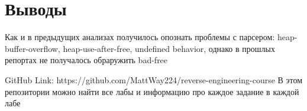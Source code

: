     \section{Выводы}
    Как и в предыдущих анализах получилось опознать проблемы с парсером: heap-buffer-overflow, heap-use-after-free, undefined behavior, однако в прошлых репортах не получалось обраружить bad-free


    \begin{thebibliography}{1}
        GitHub Link: https://github.com/MattWay224/reverse-engineering-course
        В этом репозитории можно найти все лабы и информацию про каждое задание в каждой лабе
    \end{thebibliography}

